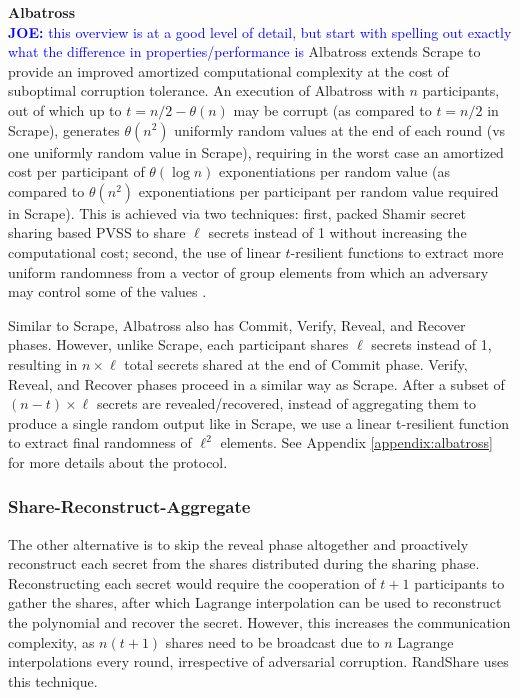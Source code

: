 \documentclass[letterpaper,twocolumn,10pt]{article}
\theoremstyle{definition}
\theoremstyle{remark}
\newcommand{\joenote}[1]{\textcolor{blue}{\textbf{JOE:} #1}}
\begin{document}
\textbf{Albatross}\\

\joenote{this overview is at a good level of detail, but start with spelling out exactly what the difference in properties/performance is}
Albatross extends Scrape to provide an improved amortized computational complexity at the cost of suboptimal corruption tolerance. An execution of Albatross with $n$ participants, out of which up to $t = n/2 - \theta(n)$ may be corrupt (as compared to $t = n/2$ in Scrape), generates $\theta(n^2)$ uniformly random values at the end of each round (vs one uniformly random value in Scrape), requiring in the worst case an amortized cost per participant of $\theta(\log n)$ exponentiations per random value (as compared to $\theta(n^2)$ exponentiations per participant per random value required in Scrape). This is achieved via two techniques: first, packed Shamir secret sharing based PVSS to share $\ell$ secrets instead of 1 without increasing the computational cost; second, the use of linear $t$-resilient functions to extract more uniform randomness from a vector of group elements from which an adversary may control some of the values . 

Similar to Scrape, Albatross also has Commit, Verify, Reveal, and Recover phases. However, unlike Scrape, each participant shares $\ell$ secrets instead of 1, resulting in $n \times \ell$ total secrets shared at the end of Commit phase. Verify, Reveal, and Recover phases proceed in a similar way as Scrape. After a subset of $(n-t) \times \ell$ secrets are revealed/recovered, instead of aggregating them to produce a single random output like in Scrape, we use a linear t-resilient function to extract final randomness of $\ell^2$ elements. See Appendix \ref{appendix:albatross} for more details about the protocol.\\

\subsubsection{Share-Reconstruct-Aggregate}
The other alternative is to skip the reveal phase altogether and proactively reconstruct each secret from the shares distributed during the sharing phase. Reconstructing each secret would require the cooperation of $t+1$ participants to gather the shares, after which Lagrange interpolation can be used to reconstruct the polynomial and recover the secret. However, this increases the communication complexity, as $n (t + 1)$ shares need to be broadcast due to $n$ Lagrange interpolations every round, irrespective of adversarial corruption. RandShare \cite{syta2017scalable} uses this technique.\\
\end{document}
